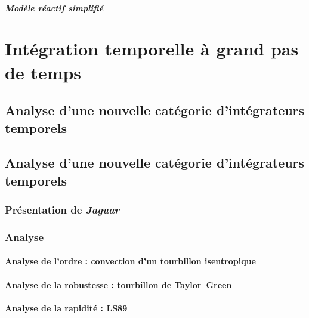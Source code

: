         \subsubsection{Modèle réactif simplifié}


\part{Intégration temporelle à grand pas de temps}

  \chapter{Analyse d’une nouvelle catégorie d’intégrateurs temporels}

  \chapter{Analyse d’une nouvelle catégorie d’intégrateurs temporels}
    \section{Présentation de \emph{Jaguar}}
    \section{Analyse}
      \subsection{Analyse de l'ordre : convection d'un tourbillon isentropique}
      \subsection{Analyse de la robustesse : tourbillon de Taylor--Green}
      \subsection{Analyse de la rapidité : LS89}



\pagebreak




